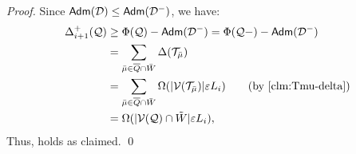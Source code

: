 \begin{proof}
	 Since $\mathsf{Adm}(\mathcal{D})\leq \mathsf{Adm}(\mathcal{D}^{-})$, we have:
	 \begin{equation*}
	 	\begin{split}
	 		\Delta^+_{i+1} (\mq) &\geq  \Phi(\mq) - \adm(\md^{-})  =\Phi(\mq-) - \adm(\md^{-})\\
	 		& = \sum_{\bar{\mu}\in \Qbar\cap \bar{W}}\Delta(\mt_{\bar{\mu}})  \\
	 		&=  \sum_{\bar{\mu}\in \Qbar\cap \bar{W}} \Omega(| \mv(\mt_{\bar{\mu}})|\epsi L_i) \qquad \mbox{(by \Cref{clm:Tmu-delta})}\\
	 		&= \Omega(|\mv(\mq)\cap \tilde{W}|\epsi L_i),
	 	\end{split}
	 \end{equation*}
 Thus,  holds as claimed. \qed
\end{proof}


